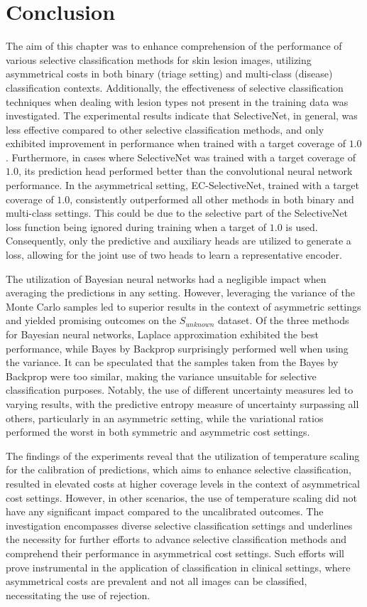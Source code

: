 \section{Conclusion}
\label{sec:selective_conclusion}
The aim of this chapter was to enhance comprehension of the performance of various selective classification methods for skin lesion images, utilizing asymmetrical costs in both binary (triage setting) and multi-class (disease) classification contexts. Additionally, the effectiveness of selective classification techniques when dealing with lesion types not present in the training data was investigated. The experimental results indicate that SelectiveNet, in general, was less effective compared to other selective classification methods, and only exhibited improvement in performance when trained with a target coverage of $1.0$. Furthermore, in cases where SelectiveNet was trained with a target coverage of $1.0$, its prediction head performed better than the convolutional neural network performance. In the asymmetrical setting, EC-SelectiveNet, trained with a target coverage of $1.0$, consistently outperformed all other methods in both binary and multi-class settings. This could be due to the selective part of the SelectiveNet loss function being ignored during training when a target of $1.0$ is used. Consequently, only the predictive and auxiliary heads are utilized to generate a loss, allowing for the joint use of two heads to learn a representative encoder.

The utilization of Bayesian neural networks had a negligible impact when averaging the predictions in any setting. However, leveraging the variance of the Monte Carlo samples led to superior results in the context of asymmetric settings and yielded promising outcomes on the $S_{unknown}$ dataset. Of the three methods for Bayesian neural networks, Laplace approximation exhibited the best performance, while Bayes by Backprop surprisingly performed well when using the variance. It can be speculated that the samples taken from the Bayes by Backprop were too similar, making the variance unsuitable for selective classification purposes. Notably, the use of different uncertainty measures led to varying results, with the predictive entropy measure of uncertainty surpassing all others, particularly in an asymmetric setting, while the variational ratios performed the worst in both symmetric and asymmetric cost settings.

The findings of the experiments reveal that the utilization of temperature scaling for the calibration of predictions, which aims to enhance selective classification, resulted in elevated costs at higher coverage levels in the context of asymmetrical cost settings. However, in other scenarios, the use of temperature scaling did not have any significant impact compared to the uncalibrated outcomes. The investigation encompasses diverse selective classification settings and underlines the necessity for further efforts to advance selective classification methods and comprehend their performance in asymmetrical cost settings. Such efforts will prove instrumental in the application of classification in clinical settings, where asymmetrical costs are prevalent and not all images can be classified, necessitating the use of rejection.